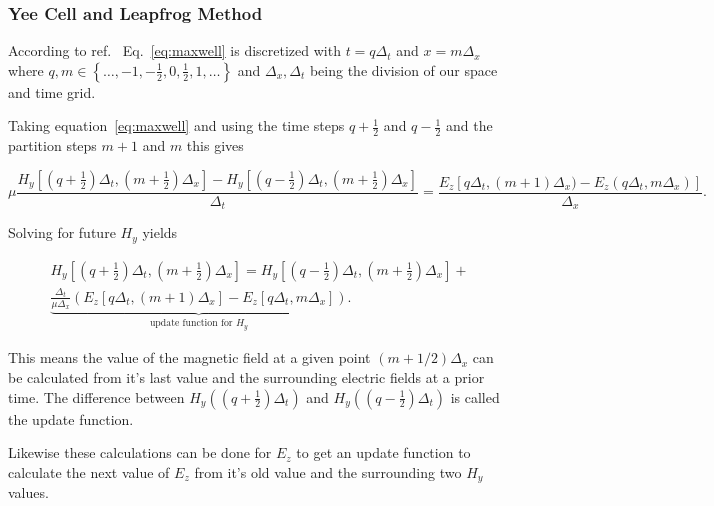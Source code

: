 \subsubsection{Yee Cell and Leapfrog Method}

According to ref.~\cite{yee} Eq.~\ref{eq:maxwell} is discretized with $t=q\Delta_t$ and $x=m\Delta_x$ where $q,m\in\left\{\dots,-1,-\frac{1}{2},0,\frac{1}{2},1,\dots\right\}$ and $\Delta_x, \Delta_t$ being the division of our space and time grid.

Taking equation~\ref{eq:maxwell} and using the time steps $q+\frac{1}{2}$ and $q-\frac{1}{2}$ and the partition steps $m+1$ and $m$ this gives

\begin{equation}
  \mu\frac{H_y\left[\left(q+\frac{1}{2}\right)\Delta_t, (m+\frac{1}{2})\Delta_x\right]-H_y\left[\left(q-\frac{1}{2}\right)\Delta_t, (m+\frac{1}{2})\Delta_x\right]}{\Delta_t}=\frac{E_z\left[q\Delta_t, (m+1)\Delta_x)-E_z(q\Delta_t, m\Delta_x)\right]}{\Delta_x}.
\end{equation}

Solving for future $H_y$ yields

\begin{multline}
  H_y\left[\left(q+\frac{1}{2}\right)\Delta_t, \left(m+\frac{1}{2}\right)\Delta_x\right]=H_y\left[\left(q-\frac{1}{2}\right)\Delta_t, \left(m+\frac{1}{2}\right)\Delta_x\right] +\\
  \underbrace{\frac{\Delta_t}{\mu\Delta_x}\left(E_z\left[q\Delta_t, (m+1)\Delta_x\right]-E_z\left[q\Delta_t, m\Delta_x\right]\right)}_\text{update function for $H_y$}.
\end{multline}

This means the value of the magnetic field at a given point $(m+1/2)\Delta_x$ can be calculated from it's last value and the surrounding electric fields at a prior time. The difference between $H_y((q+\frac{1}{2})\Delta_t)$ and $H_y((q-\frac{1}{2})\Delta_t)$ is called the update function.

Likewise these calculations can be done for $E_z$ to get an update function to calculate the next value of $E_z$ from it's old value and the surrounding two $H_y$ values.

